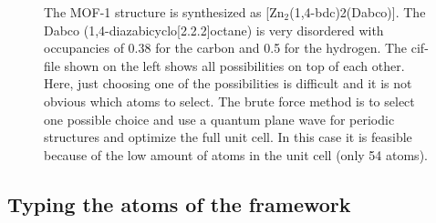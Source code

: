 \begin{figure}[p]
   \hskip 1cm
  \caption{The MOF-1 structure is synthesized as [Zn$_2$(1,4-bdc)2(Dabco)]. The Dabco (1,4-diazabicyclo[2.2.2]octane) is very
          disordered with occupancies of 0.38 for the carbon and 0.5 for the hydrogen. The cif-file shown on the left shows all
          possibilities on top of each other. Here, just choosing one of the possibilities
          is difficult and it is not obvious which atoms to select. The brute force method is to select one possible choice and
          use a quantum plane wave for periodic structures and optimize the full unit cell. In this case it is feasible because
          of the low amount of atoms in the unit cell (only 54 atoms).}
  \label{Fig: cif vs dmol}
\end{figure}

\subsection{Typing the atoms of the framework}

